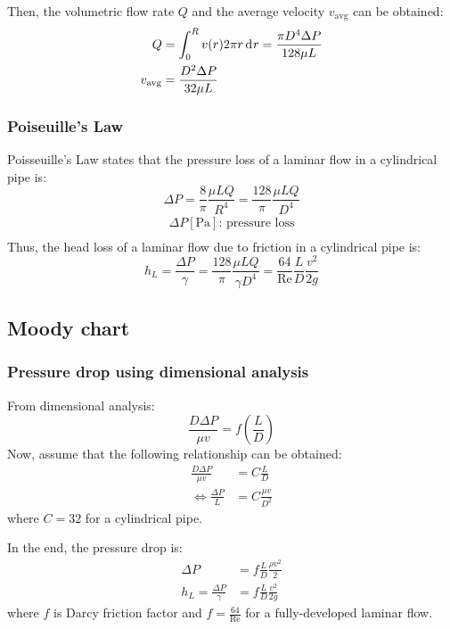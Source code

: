 \documentclass[10pt, twocolumn]{article}
\begin{document}
Then, the volumetric flow rate \(Q\) and the average velocity \(v_\mathrm{avg}\) can be obtained:
\begin{align*}
  Q              & = \int_0^R{v(r) 2 \pi r \,\mathrm{d}^{} r} =\frac{\pi D^4 \Delta P}{128 \mu L} \\
  v_\mathrm{avg} & = \frac{D^2 \Delta P}{32 \mu L}
\end{align*}


\subsubsection{Poiseuille's Law}
Poisseuille's Law states that the pressure loss of a laminar flow in a cylindrical pipe is:
\[
  \Delta P = \frac{8}{\pi} \frac{\mu L Q}{R^4} = \frac{128}{\pi} \frac{\mu L Q}{D^4}
\]
\[
  \begin{array}{|l}
    \Delta P [\si{\pascal}] \text{: pressure loss} \\
  \end{array}
\]
Thus, the head loss of a laminar flow due to friction in a cylindrical pipe is:
\[
  h_L = \frac{\Delta P}{\gamma} =\frac{128}{\pi} \frac{\mu L Q}{\gamma D^4} = \frac{64}{\mathrm{Re}} \frac{L}{D} \frac{v^2}{2g}
\]


\subsection{Moody chart}
\subsubsection{Pressure drop using dimensional analysis}
From dimensional analysis:
\[
  \frac{D \Delta P}{\mu v} = f\left( \frac{L}{D} \right)
\]
Now, assume that the following relationship can be obtained:
\begin{align*}
  \frac{D \Delta P}{\mu v} & = C \frac{L}{D}       \\
  \iff \frac{\Delta P}{L}  & = C \frac{\mu v}{D^2}
\end{align*}
where \(C = 32\) for a cylindrical pipe.

In the end, the pressure drop is:
\begin{align*}
  \Delta P                      & = f \frac{L}{D} \frac{\rho v^2}{2} \\
  h_L = \frac{\Delta P}{\gamma} & = f \frac{L}{D} \frac{v^2}{2g}
\end{align*}
where \(f\) is Darcy friction factor and \(f = \frac{64}{\mathrm{Re}}\) for a fully-developed laminar flow.
\end{document}
